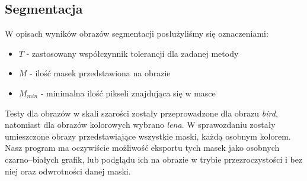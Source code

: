 \documentclass{classrep}
\begin{document}
\subsection{Segmentacja}
W opisach wyników obrazów segmentacji posłużyliśmy się oznaczeniami:
\begin{itemize}
\item $T$ - zastosowany współczynnik tolerancji dla zadanej metody
\item $M$ - ilość masek przedstawiona na obrazie
\item $M_{min}$ - minimalna ilość pikseli znajdująca się w masce
\end{itemize}

Testy dla obrazów w skali szarości zostały przeprowadzone dla obrazu \textit{bird}, natomiast dla obrazów kolorowych wybrano \textit{lena}. W sprawozdaniu zostały umieszczone obrazy przedstawiające wszystkie maski, każdą osobnym kolorem. Nasz program ma oczywiście możliwość eksportu tych masek jako osobnych czarno--białych grafik, lub podglądu ich na obrazie w trybie przezroczystości i bez niej oraz odwrotności danej maski.
\end{document}
